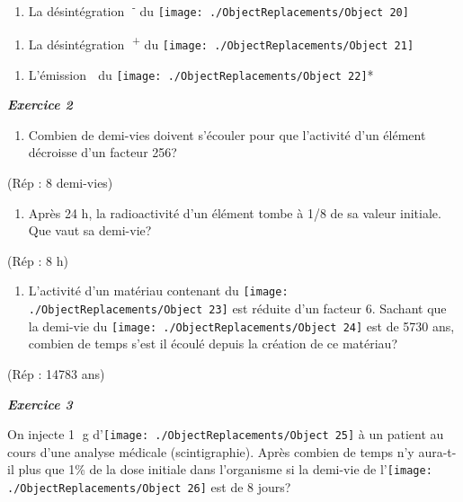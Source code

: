\begin{enumerate}
\def\labelenumi{\alph{enumi})}
\tightlist
\item
  La désintégration \textsuperscript{-} du
  \texttt{[image: ./ObjectReplacements/Object 20]}
\end{enumerate}

\begin{enumerate}
\def\labelenumi{\alph{enumi})}
\tightlist
\item
  La désintégration \textsuperscript{+} du
  \texttt{[image: ./ObjectReplacements/Object 21]}
\end{enumerate}

\begin{enumerate}
\def\labelenumi{\alph{enumi})}
\tightlist
\item
  L'émission  du
  \texttt{[image: ./ObjectReplacements/Object 22]}*
\end{enumerate}

\emph{\textbf{Exercice 2}}

\begin{enumerate}
\def\labelenumi{\alph{enumi})}
\tightlist
\item
  Combien de demi-vies doivent s'écouler pour que l'activité d'un
  élément décroisse d'un facteur 256?
\end{enumerate}

(Rép : 8 demi-vies)

\begin{enumerate}
\def\labelenumi{\alph{enumi})}
\tightlist
\item
  Après 24 h, la radioactivité d'un élément tombe à 1/8 de sa valeur
  initiale. Que vaut sa demi-vie?
\end{enumerate}

(Rép : 8 h)

\begin{enumerate}
\def\labelenumi{\alph{enumi})}
\tightlist
\item
  L'activité d'un matériau contenant du
  \texttt{[image: ./ObjectReplacements/Object 23]}
  est réduite d'un facteur 6. Sachant que la demi-vie du
  \texttt{[image: ./ObjectReplacements/Object 24]}
  est de 5730 ans, combien de temps s'est il écoulé depuis la création
  de ce matériau?
\end{enumerate}

(Rép : 14783 ans)

\emph{\textbf{Exercice 3}}

On injecte 1 g
d'\texttt{[image: ./ObjectReplacements/Object 25]}
à un patient au cours d'une analyse médicale (scintigraphie). Après
combien de temps n'y aura-t-il plus que 1\% de la dose initiale dans
l'organisme si la demi-vie de
l'\texttt{[image: ./ObjectReplacements/Object 26]}
est de 8 jours?

